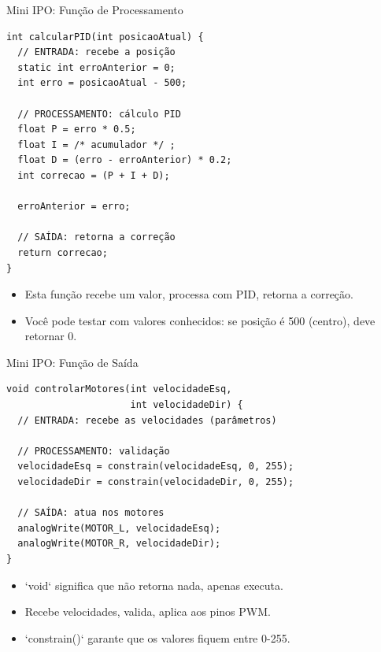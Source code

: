 \documentclass[10pt]{beamer}
\begin{document}
\begin{frame}[fragile]{Mini IPO: Função de Processamento}
\begin{lstlisting}
int calcularPID(int posicaoAtual) {
  // ENTRADA: recebe a posição
  static int erroAnterior = 0;
  int erro = posicaoAtual - 500;
  
  // PROCESSAMENTO: cálculo PID
  float P = erro * 0.5;
  float I = /* acumulador */ ;
  float D = (erro - erroAnterior) * 0.2;
  int correcao = (P + I + D);
  
  erroAnterior = erro;
  
  // SAÍDA: retorna a correção
  return correcao;
}
\end{lstlisting}

  \begin{itemize}
    \item Esta função recebe um valor, processa com PID, retorna a correção.
    \item Você pode testar com valores conhecidos: se posição é 500 (centro), deve retornar 0.
  \end{itemize}
\end{frame}

\begin{frame}[fragile]{Mini IPO: Função de Saída}
\begin{lstlisting}
void controlarMotores(int velocidadeEsq, 
                      int velocidadeDir) {
  // ENTRADA: recebe as velocidades (parâmetros)
  
  // PROCESSAMENTO: validação
  velocidadeEsq = constrain(velocidadeEsq, 0, 255);
  velocidadeDir = constrain(velocidadeDir, 0, 255);
  
  // SAÍDA: atua nos motores
  analogWrite(MOTOR_L, velocidadeEsq);
  analogWrite(MOTOR_R, velocidadeDir);
}
\end{lstlisting}

  \begin{itemize}
    \item `void` significa que não retorna nada, apenas executa.
    \item Recebe velocidades, valida, aplica aos pinos PWM.
    \item `constrain()` garante que os valores fiquem entre 0-255.
  \end{itemize}
\end{frame}
\end{document}
